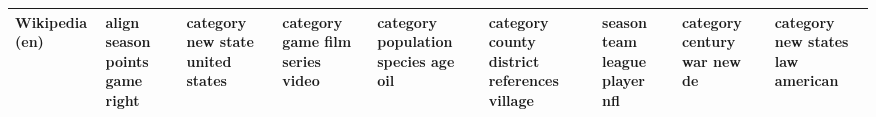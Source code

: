 \documentclass[11pt,a4paper]{article}
\begin{document}
\begin{appendices}
\begin{table}[htb]
\begin{tiny}
\begin{tabular}{|p{}|p{}|p{}|p{}|p{}|p{}|p{}|p{}|p{}|}
    Wikipedia (en) & align \newline season \newline points \newline game \newline right & category \newline new \newline state \newline united \newline states & category \newline game \newline film \newline series \newline video & category \newline population \newline species \newline age \newline oil & category \newline county \newline district \newline references \newline village & season \newline team \newline league \newline player \newline nfl & category \newline century \newline war \newline new \newline de & category \newline new \newline states \newline law \newline american\\\hline

\end{tabular}
\end{tiny}
\end{table}
\end{appendices}
\end{document}
